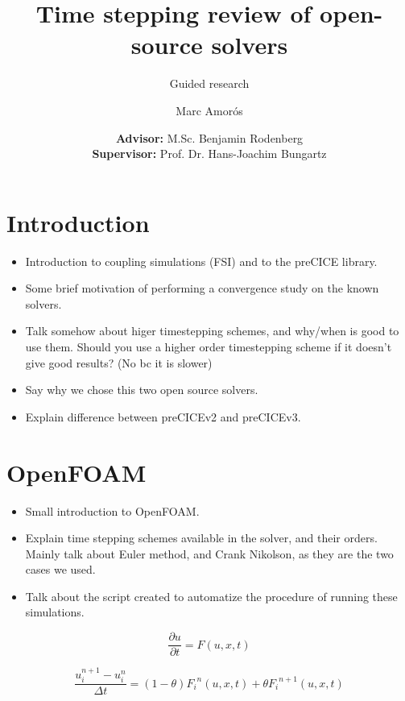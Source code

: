 \documentclass[
  english,        %
  font=times,     %
  onecolumn,      %
]{tumarticle}
\title{Time stepping review of open-source solvers}
\subtitle{Guided research}
\author[email=marc.amoros@tum.de]{Marc Amorós}
\date{
    \small
    \textbf{Advisor:} M.Sc. Benjamin Rodenberg \\
    \textbf{Supervisor:} Prof. Dr. Hans-Joachim Bungartz \\
}
\begin{document}
\maketitle


\section{Introduction}
\begin{itemize}
    \item Introduction to coupling simulations (FSI) and to the preCICE library. 
    \item Some brief motivation of performing a convergence study on the known solvers.
    \item Talk somehow about higer timestepping schemes, and why/when is good to use them. Should you use a higher order timestepping scheme if it doesn't give good results? (No bc it is slower) 
    \item Say why we chose this two open source solvers.
    \item Explain difference between preCICEv2 and preCICEv3.
\end{itemize}


\section{OpenFOAM}
\begin{itemize}
    \item Small introduction to OpenFOAM.
    \item Explain time stepping schemes available in the solver, and their orders. Mainly talk about Euler method, and Crank Nikolson, as they are the two cases we used.
    \item Talk about the script created to automatize the procedure of running these simulations. 
\end{itemize}

\begin{equation}
    \frac{\partial u}{\partial t} = F(u, x, t)
\end{equation}

\begin{equation}
    \frac{u_i^{n+1} - u_i^n}{\Delta t} = (1 - \theta) {F_i}^{n}(u, x, t) + \theta {F_i}^{n+1}(u, x, t)
\end{equation}
\end{document}
